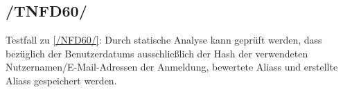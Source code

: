 \subsection*{/TNFD60/}
\label{/TNFD60/} Testfall zu \ref{/NFD60/}: Durch \gls{statische Analyse} kann geprüft werden, dass bezüglich der \Glspl{Benutzerdatum} ausschließlich der \Gls{Hash} der verwendeten Nutzernamen/E-Mail-Adressen der Anmeldung, bewertete \Glspl{Alias} und erstellte \Glspl{Alias} gespeichert werden.